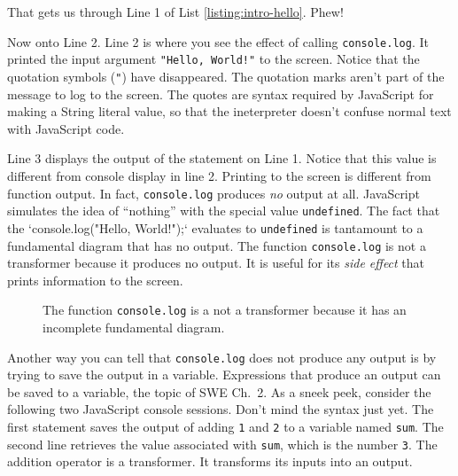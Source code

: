 That gets us through Line 1 of List \ref{listing:intro-hello}. Phew!

Now onto Line 2. Line 2 is where you see the effect of calling \texttt{console.log}. It printed the input argument \texttt{"Hello, World!"} to the screen. Notice that the quotation symbols (\texttt{"}) have disappeared.  The quotation marks aren't part of the message to log to the screen. The quotes are syntax required by JavaScript for making a \textsf{String} literal value, so that the ineterpreter doesn't confuse normal text with JavaScript code.

Line 3 displays the output of the statement on Line 1. Notice that this value is different from console display in line 2. Printing to the screen is different from function output. In fact, \texttt{console.log} produces \textit{no} output at all. JavaScript simulates the idea of ``nothing'' with the special value \texttt{undefined}. The fact that the `console.log("Hello, World!");` evaluates to \texttt{undefined} is tantamount to a fundamental diagram that has no output. The function \texttt{console.log} is not a transformer because it produces no output. It is useful for its \emph{side effect} that prints information to the screen.

\begin{figure}[h]
  
  \caption{The function \texttt{console.log} is a not a transformer because it has an incomplete fundamental diagram.}
\end{figure}

Another way you can tell that \texttt{console.log} does not produce any output is by trying to save the output in a variable. Expressions that produce an output can be saved to a variable, the topic of SWE Ch.~2. As a sneek peek, consider the following two JavaScript console sessions. Don't mind the syntax just yet. The first statement saves the output of adding \texttt{1} and \texttt{2} to a variable named \texttt{sum}. The second line retrieves the value associated with \texttt{sum}, which is the number \texttt{3}. The addition operator is a transformer. It transforms its inputs into an output.


